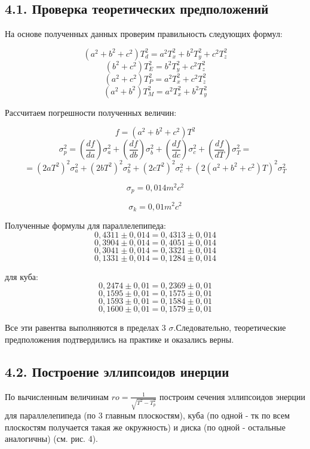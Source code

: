 \subsection*{4.1. Проверка теоретических предположений}

    На основе полученных данных проверим правильность следующих формул:
    
\[(a^2+b^2+c^2)T_d^2 = a^2T_x^2 + b^2T_y^2 + c^2T_z^2\]
\[(b^2+c^2)T_E^2 = b^2T_y^2 + c^2T_z^2\]
\[(a^2+c^2)T_P^2 = a^2T_x^2 + c^2T_z^2\]
\[(a^2+b^2)T_M^2 = a^2T_x^2 + b^2T_y^2\]

    Рассчитаем погрешности полученных величин:
    
\[f = (a^2 + b^2 + c^2)T^2\]
\[\sigma_p^2 = \left(\frac{df}{da}\right)\sigma_a^2 + \left(\frac{df}{db}\right)\sigma_b^2 + \left(\frac{df}{dc}\right)\sigma_c^2 + \left(\frac{df}{dT}\right)\sigma_T^2 =\]
\[= (2aT^2)^2\sigma_a^2 +(2bT^2)^2\sigma_b^2 +(2cT^2)^2\sigma_c^2 + (2(a^2 + b^2 + c^2)T)^2\sigma_T^2\]

\[\sigma_p = 0,014 m^2c^2\]

\[\sigma_k = 0,01 m^2c^2\]


    Полученные формулы для параллелепипеда:
\[ 0,4311 \pm 0,014 = 0,4313 \pm 0,014\]
\[ 0,3904 \pm 0,014 = 0,4051 \pm 0,014\]
\[ 0,3041 \pm 0,014 = 0,3321 \pm 0,014\]
\[ 0,1331 \pm 0,014 = 0,1284 \pm 0,014\]
    
    
    для куба:
\[ 0,2474 \pm 0,01 = 0,2369 \pm 0,01\]
\[ 0,1595 \pm 0,01 = 0,1575 \pm 0,01\]
\[ 0,1593 \pm 0,01 = 0,1584 \pm 0,01\]
\[ 0,1600 \pm 0,01 = 0,1579 \pm 0,01\]




    Все эти равентва выполняются в пределах 3 $\sigma$.Следовательно, теоретические предположения подтвердились на практике и оказались верны.

\subsection*{4.2. Построение эллипсоидов инерции}

    По вычисленным величинам $ro = \frac{1}{\sqrt{T^2 - T_p^2}}$ построим сечения  эллипсоидов энерции для параллелепипеда (по 3 главным плоскостям), куба (по одной - тк по всем плоскостям получается такая же окружность) и диска (по одной - остальные аналогичны) (см. рис. 4).

